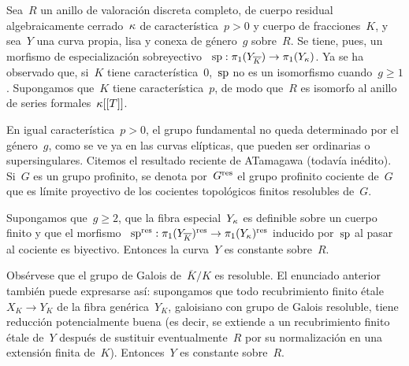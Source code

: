 \iforig
\else
\begin{remarqueMR}
\label{X.2.14}
Sea~$R$ un anillo de valoración discreta completo, de cuerpo residual
algebraicamente cerrado~$\kres$ de característica~$p>0$ y cuerpo de
fracciones~$K$, y sea~$Y$ una curva propia, lisa y conexa de género~$g$
sobre~$R$. Se tiene, pues, un morfismo de especialización sobreyectivo
~$\sp : \pi_1(Y_{\overline{K}})\to\pi_1(Y_{\kres})$.
Ya se ha observado que, si~$K$ tiene característica~0,~$\sp$ no es un
isomorfismo cuando~$g\geq1$. Supongamos que~$K$ tiene característica~$p$, de
modo que~$R$ es isomorfo al anillo de series formales~$\kres[[T]]$.

En igual característica~$p>0$, el grupo fundamental no queda determinado por
el género~$g$, como se ve ya en las curvas elípticas, que pueden ser ordinarias
o supersingulares. Citemos el resultado reciente de A\ptbl Tamagawa (todavía
inédito). Si~$G$ es un grupo profinito, se denota por~$G^{\res}$ el grupo
profinito cociente de~$G$ que es límite proyectivo de los cocientes topológicos
finitos resolubles de~$G$.

\begin{theoremstar}
Supongamos que~$g\geq2$, que la fibra especial~$Y_{\kres}$ es definible sobre
un cuerpo finito y que el morfismo
~$\sp^{\res}:\pi_1(Y_{\overline{K}})^{\res}\to
\pi_1(Y_{\kres})^{\res}$ inducido por~$\sp$ al pasar al cociente es biyectivo.
Entonces la curva~$Y$ es constante sobre~$R$.
\end{theoremstar}

Obsérvese que el grupo de Galois de~$\overline{K}/K$ es resoluble. El enunciado
anterior también puede expresarse así: supongamos que todo recubrimiento finito
étale~$X_K\to Y_K$ de la fibra genérica~$Y_K$, galoisiano con grupo de Galois
resoluble, tiene reducción potencialmente buena (es decir, se extiende a un
recubrimiento finito étale de~$Y$ después de sustituir eventualmente~$R$ por
su normalización en una extensión finita de~$K$). Entonces~$Y$ es constante
sobre~$R$.
\end{remarqueMR}
\fi
